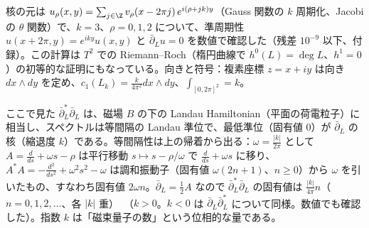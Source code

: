 核の元は $u_\rho(x,y)=\sum_{j\in\Z}v_\rho(x-2\pi j)\,e^{i(\rho+jk)y}$（Gauss 関数の $k$ 周期化、Jacobi の $\theta$ 関数）で、$k=3$、$\rho=0,1,2$ について、準周期性 $u(x+2\pi,y)=e^{iky}u(x,y)$ と $\bar\partial_Lu=0$ を数値で確認した（残差 $10^{-9}$ 以下、付録）。この計算は $T^2$ での Riemann--Roch（楕円曲線で $h^0(L)=\deg L$、$h^1=0$）の初等的な証明にもなっている。向きと符号：複素座標 $z=x+iy$ は向き $dx\wedge dy$ を定め、$c_1(L_k)=\frac k{4\pi^2}dx\wedge dy$、$\int_{[0,2\pi]^2}=k$。
\begin{rem}[物理との対応]
ここで見た $\bar\partial_L^*\bar\partial_L$ は、磁場 $B$ の下の Landau Hamiltonian（平面の荷電粒子）に相当し、スペクトルは等間隔の Landau 準位で、最低準位（固有値 $0$）が $\bar\partial_L$ の核（縮退度 $k$）である。等間隔性は上の帰着から出る：$\omega=\frac{|k|}{2\pi}$ として $A=\frac d{ds}+\omega s-\rho$ は平行移動 $s\mapsto s-\rho/\omega$ で $\frac d{ds}+\omega s$ に移り、$A^*A=-\frac{d^2}{ds^2}+\omega^2s^2-\omega$ は調和振動子（固有値 $\omega(2n+1)$、$n\ge0$）から $\omega$ を引いたもの、すなわち固有値 $2\omega n$。$\bar\partial_L=\frac12A$ なので $\bar\partial_L^*\bar\partial_L$ の固有値は $\frac{|k|}{4\pi}n$（$n=0,1,2,\dots$、各 $|k|$ 重）\tP\ （$k>0$。$k<0$ は $\bar\partial_L\bar\partial_L^*$ について同様。数値でも確認した）。指数 $k$ は「磁束量子の数」という位相的な量である。
\end{rem}

